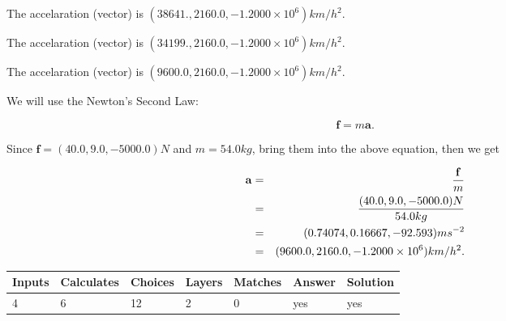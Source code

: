 \documentclass[12pt]{article}
\begin{document}
 
The accelaration (vector) is
$(
38641.,
2160.0 ,
-1.2000 \times 10^{6}
)km/h^2.
$
 
 
The accelaration (vector) is
$(
34199.,
2160.0 ,
-1.2000 \times 10^{6}
)km/h^2.
$
 
 
\noindent{}
 
 
The accelaration (vector) is
$(
9600.0,
2160.0 ,
-1.2000 \times 10^{6}
)km/h^2.
$
 
 
\noindent{}
 
 
 
 
 
 
\noindent{}
 
 

We will use the Newton's Second Law:
 
\[
\mathbf{f}=m\mathbf{a}.
\]
 
Since $\mathbf{f}=( %
40.0,  %
9.0,  %
-5000.0 )N$
and $m= %
54.0 kg$, bring them into the above equation, then we get
 
\begin{eqnarray*}
\mathbf{a}&=&\frac{\mathbf{f}}m  \\
&=&\frac{(
40.0 ,
9.0 ,
-5000.0 )N
}{ %
54.0 kg}  \\
&=&(
0.74074 ,
0.16667,
-92.593
)ms^{-2} \\
&=&(
9600.0 ,
2160.0 ,
-1.2000 \times 10^{6}
)km/h^2.
\end{eqnarray*}
 
 
 
\noindent{}
 
 

 
 
\vspace{0.3in}
   
   
   
   
\noindent\begin{tabular}{|l|l|l|l|l|l|l|}
 \hline
Inputs & Calculates & Choices & Layers & Matches & Answer & Solution \\ \hline
           4  & 
           6  & 
          12
  & 
           2  & 
           0  & 
  yes & 
  yes 
  \\ \hline
 \end{tabular}
   
\end{document}
